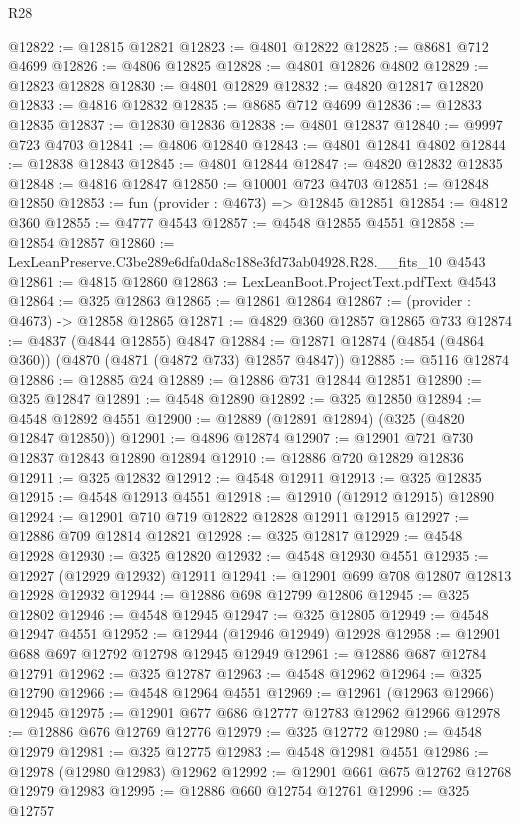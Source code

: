 \begin{lexlean}{R28}
\begin{coremodule}
@12822 := @12815 @12821
@12823 := @4801 @12822
@12825 := @8681 @712 @4699
@12826 := @4806 @12825
@12828 := @4801 @12826 @4802
@12829 := @12823 @12828
@12830 := @4801 @12829
@12832 := @4820 @12817 @12820
@12833 := @4816 @12832
@12835 := @8685 @712 @4699
@12836 := @12833 @12835
@12837 := @12830 @12836
@12838 := @4801 @12837
@12840 := @9997 @723 @4703
@12841 := @4806 @12840
@12843 := @4801 @12841 @4802
@12844 := @12838 @12843
@12845 := @4801 @12844
@12847 := @4820 @12832 @12835
@12848 := @4816 @12847
@12850 := @10001 @723 @4703
@12851 := @12848 @12850
@12853 := fun (provider : @4673) => @12845 @12851
@12854 := @4812 @360
@12855 := @4777 @4543
@12857 := @4548 @12855 @4551
@12858 := @12854 @12857
@12860 := LexLeanPreserve.C3be289e6dfa0da8c188e3fd73ab04928.R28.__fits_10 @4543
@12861 := @4815 @12860
@12863 := LexLeanBoot.ProjectText.pdfText @4543
@12864 := @325 @12863
@12865 := @12861 @12864
@12867 := (provider : @4673) -> @12858 @12865
@12871 := @4829 @360 @12857 @12865 @733
@12874 := @4837 (@4844 @12855) @4847
@12884 := @12871 @12874 (@4854 (@4864 @360)) (@4870 (@4871 (@4872 @733) @12857 @4847))
@12885 := @5116 @12874
@12886 := @12885 @24
@12889 := @12886 @731 @12844 @12851
@12890 := @325 @12847
@12891 := @4548 @12890
@12892 := @325 @12850
@12894 := @4548 @12892 @4551
@12900 := @12889 (@12891 @12894) (@325 (@4820 @12847 @12850))
@12901 := @4896 @12874
@12907 := @12901 @721 @730 @12837 @12843 @12890 @12894
@12910 := @12886 @720 @12829 @12836
@12911 := @325 @12832
@12912 := @4548 @12911
@12913 := @325 @12835
@12915 := @4548 @12913 @4551
@12918 := @12910 (@12912 @12915) @12890
@12924 := @12901 @710 @719 @12822 @12828 @12911 @12915
@12927 := @12886 @709 @12814 @12821
@12928 := @325 @12817
@12929 := @4548 @12928
@12930 := @325 @12820
@12932 := @4548 @12930 @4551
@12935 := @12927 (@12929 @12932) @12911
@12941 := @12901 @699 @708 @12807 @12813 @12928 @12932
@12944 := @12886 @698 @12799 @12806
@12945 := @325 @12802
@12946 := @4548 @12945
@12947 := @325 @12805
@12949 := @4548 @12947 @4551
@12952 := @12944 (@12946 @12949) @12928
@12958 := @12901 @688 @697 @12792 @12798 @12945 @12949
@12961 := @12886 @687 @12784 @12791
@12962 := @325 @12787
@12963 := @4548 @12962
@12964 := @325 @12790
@12966 := @4548 @12964 @4551
@12969 := @12961 (@12963 @12966) @12945
@12975 := @12901 @677 @686 @12777 @12783 @12962 @12966
@12978 := @12886 @676 @12769 @12776
@12979 := @325 @12772
@12980 := @4548 @12979
@12981 := @325 @12775
@12983 := @4548 @12981 @4551
@12986 := @12978 (@12980 @12983) @12962
@12992 := @12901 @661 @675 @12762 @12768 @12979 @12983
@12995 := @12886 @660 @12754 @12761
@12996 := @325 @12757

\end{coremodule}
\end{lexlean}
